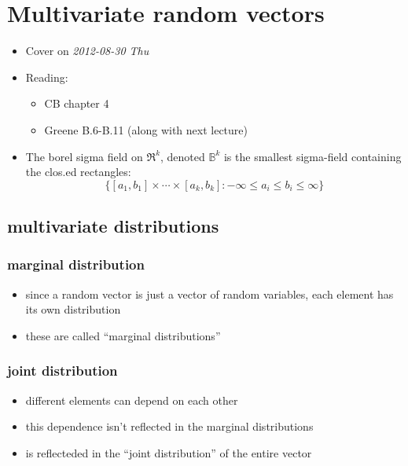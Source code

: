
\chapter{Multivariate random vectors}

\begin{itemize}
\item Cover on \textit{2012-08-30 Thu}
\item Reading:
\begin{itemize}
\item CB chapter 4
\item Greene B.6-B.11 (along with next lecture)
\end{itemize}
\item The borel sigma field on $\Re^k$, denoted $\mathbb{B}^k$ is the
     smallest sigma-field containing the clos.ed
     rectangles: \[\{[a_1,b_1] \times \cdots \times [a_k,b_k] : -
     \infty \leq a_i \leq b_i \leq \infty\}\]
\end{itemize}
\section{multivariate distributions}
\label{sec-1}
\subsection{marginal distribution}
\label{sec-1-1}

\begin{itemize}
\item since a random vector is just a vector of random variables, each
       element has its own distribution
\item these are called ``marginal distributions''
\end{itemize}
\subsection{joint distribution}
\label{sec-1-2}

\begin{itemize}
\item different elements can depend on each other
\item this dependence isn't reflected in the marginal distributions
\item is reflecteded in the ``joint distribution'' of the entire vector
\end{itemize}
